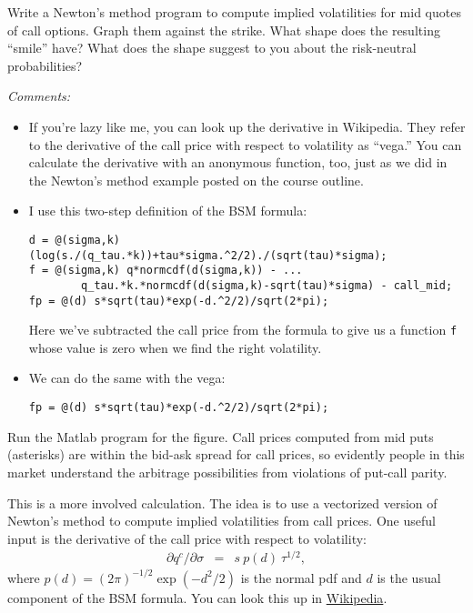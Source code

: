 \documentclass[11pt]{exam}
\begin{document}
\begin{questions}
\begin{parts}
\item Write a Newton's method program
to compute implied volatilities for mid quotes of call options.
Graph them against the strike.
What shape does the resulting ``smile'' have?
What does the shape suggest to you about the risk-neutral probabilities?
\end{parts}
{\it Comments:
\begin{itemize}
\item If you're lazy like me, you can look up the derivative in Wikipedia.
They refer to the derivative of the call price with respect to volatility
as ``vega.''
You can calculate the derivative with an anonymous function, too,
just as we did in the Newton's method example posted on the course outline.
\item I use this two-step definition of the BSM formula:
\begin{verbatim}
d = @(sigma,k) (log(s./(q_tau.*k))+tau*sigma.^2/2)./(sqrt(tau)*sigma);
f = @(sigma,k) q*normcdf(d(sigma,k)) - ...
        q_tau.*k.*normcdf(d(sigma,k)-sqrt(tau)*sigma) - call_mid;
fp = @(d) s*sqrt(tau)*exp(-d.^2/2)/sqrt(2*pi);
\end{verbatim}
Here we've subtracted the call price from the formula to give us a
function {\tt f} whose value is zero when we find the right volatility.
\item We can do the same with the vega:
\begin{verbatim}
fp = @(d) s*sqrt(tau)*exp(-d.^2/2)/sqrt(2*pi);
\end{verbatim}
\end{itemize}
}

\begin{solution}
\begin{parts}
\item
Run the Matlab program for the figure.
Call prices computed from mid puts (asterisks)
are within the bid-ask spread for call prices,
so evidently people in this market understand
the arbitrage possibilities from violations of put-call parity.

\item This is a more involved calculation.
The idea is to use a vectorized version of Newton's method to
compute implied volatilities from call prices.
One useful input is the derivative of the call price with respect
to volatility:
\begin{eqnarray*}
    \partial q^c/\partial \sigma &=& s \ p(d) \ \tau^{1/2} ,
\end{eqnarray*}
where $p(d) = (2 \pi)^{-1/2} \exp(-d^2/2) $ is the normal pdf
and $d$ is the usual component of the BSM formula.
You can look this up in 
\href{http://en.wikipedia.org/wiki/Black-Scholes#The_Greeks}{Wikipedia}.  


\end{parts}
\end{solution}
\end{questions}
\end{document}
